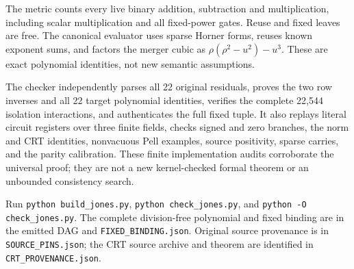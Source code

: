 The metric counts every live binary addition, subtraction and
multiplication, including scalar multiplication and all fixed-power gates.
Reuse and fixed leaves are free. The canonical evaluator uses sparse Horner
forms, reuses known exponent sums, and factors the merger cubic as
$\rho(\rho^2-u^2)-u^3$. These are exact polynomial identities, not new
semantic assumptions.

The checker independently parses all 22 original residuals, proves the two
row inverses and all 22 target polynomial identities, verifies the complete
22,544 isolation interactions, and authenticates the full fixed tuple. It
also replays literal circuit registers over three finite fields, checks signed
and zero branches, the norm and CRT identities, nonvacuous Pell examples,
source positivity, sparse carries, and the parity calibration. These finite
implementation audits corroborate the universal proof; they are not a new
kernel-checked formal theorem or an unbounded consistency search.

Run \texttt{python build\_jones.py}, \texttt{python check\_jones.py}, and
\texttt{python -O check\_jones.py}. The complete division-free polynomial and
fixed binding are in the emitted DAG and \texttt{FIXED\_BINDING.json}.
Original source provenance is in \texttt{SOURCE\_PINS.json}; the CRT source
archive and theorem are identified in \texttt{CRT\_PROVENANCE.json}.
